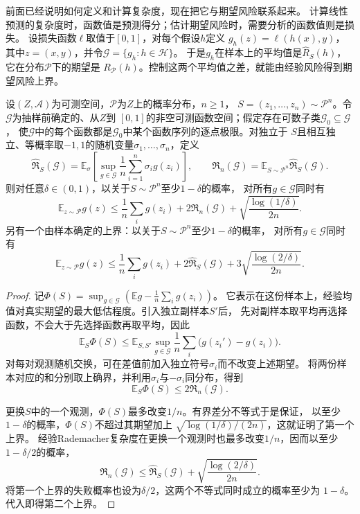 前面已经说明如何定义和计算复杂度，现在把它与期望风险联系起来。
计算线性预测的复杂度时，函数值是预测得分；估计期望风险时，需要分析的函数值则是损失。
设损失函数$\ell$取值于$[0,1]$，对每个假设$h$定义
$g_h(z)=\ell(h(x),y)$，其中$z=(x,y)$，并令$\mathcal G=\{g_h:h\in\mathcal H\}$。
于是$g_h$在样本上的平均值是$\hat R_S(h)$，它在分布$\mathcal P$下的期望是
$R_{\mathcal P}(h)$。控制这两个平均值之差，就能由经验风险得到期望风险上界。

\begin{theorem}[Rademacher复杂度给出的期望风险上界]
\label{thm:rademacher-risk-bound}
设$(Z,\mathcal A)$为可测空间，$\mathcal P$为$Z$上的概率分布，$n\geq1$，
$S=(z_1,\ldots,z_n)\sim\mathcal P^n$。令$\mathcal G$为抽样前确定的、从$Z$到
$[0,1]$的非空可测函数空间；假定存在可数子类$\mathcal G_0\subseteq\mathcal G$，
使$\mathcal G$中的每个函数都是$\mathcal G_0$中某个函数序列的逐点极限。对独立于
$S$且相互独立、等概率取$-1,1$的随机变量$\sigma_1,\ldots,\sigma_n$，定义
\[
 \widehat{\mathfrak R}_S(\mathcal G)
 =\mathbb E_\sigma\left[\sup_{g\in\mathcal G}
   \frac1n\sum_{i=1}^n\sigma_i g(z_i)\right],\qquad
 \mathfrak R_n(\mathcal G)
 =\mathbb E_{S\sim\mathcal P^n}\widehat{\mathfrak R}_S(\mathcal G).
\]
则对任意$\delta\in(0,1)$，以关于$S\sim\mathcal P^n$至少$1-\delta$的概率，
对所有$g\in\mathcal G$同时有
\begin{equation}
 \mathbb E_{z\sim\mathcal P}g(z)
 \leq\frac1n\sum_i g(z_i)+2\mathfrak R_n(\mathcal G)
 +\sqrt{\frac{\log(1/\delta)}{2n}}.
 \label{eq:rademacher-risk-bound}
\end{equation}
另有一个由样本确定的上界：以关于$S\sim\mathcal P^n$至少$1-\delta$的概率，
对所有$g\in\mathcal G$同时有
\begin{equation}
 \mathbb E_{z\sim\mathcal P}g(z)
 \leq\frac1n\sum_i g(z_i)+2\widehat{\mathfrak R}_S(\mathcal G)
 +3\sqrt{\frac{\log(2/\delta)}{2n}}.
 \label{eq:empirical-rademacher-risk-bound}
\end{equation}
\end{theorem}

\begin{proof}
记$\Phi(S)=\sup_{g\in\mathcal G}(\mathbb E g-\frac1n\sum_i g(z_i))$。
它表示在这份样本上，经验均值对真实期望的最大低估程度。引入独立副样本$S'$后，
先对副样本取平均再选择函数，不会大于先选择函数再取平均，因此
\[
 \mathbb E_S\Phi(S)
 \leq\mathbb E_{S,S'}\sup_{g\in\mathcal G}
 \frac1n\sum_i\bigl(g(z_i')-g(z_i)\bigr).
\]
对每对观测随机交换，可在差值前加入独立符号$\sigma_i$而不改变上述期望。
将两份样本对应的和分别取上确界，并利用$\sigma_i$与$-\sigma_i$同分布，得到
\begin{equation}
 \mathbb E_S\Phi(S)\leq2\mathfrak R_n(\mathcal G).
 \label{eq:rademacher-symmetrization}
\end{equation}

更换$S$中的一个观测，$\Phi(S)$最多改变$1/n$。有界差分不等式于是保证，
以至少$1-\delta$的概率，$\Phi(S)$不超过其期望加上
$\sqrt{\log(1/\delta)/(2n)}$，这就证明了第一个上界。
经验Rademacher复杂度在更换一个观测时也最多改变$1/n$，因而以至少$1-\delta/2$的概率，
\[
 \mathfrak R_n(\mathcal G)
 \leq\widehat{\mathfrak R}_S(\mathcal G)
 +\sqrt{\frac{\log(2/\delta)}{2n}}.
\]
将第一个上界的失败概率也设为$\delta/2$，这两个不等式同时成立的概率至少为
$1-\delta$。代入即得第二个上界。
\end{proof}

